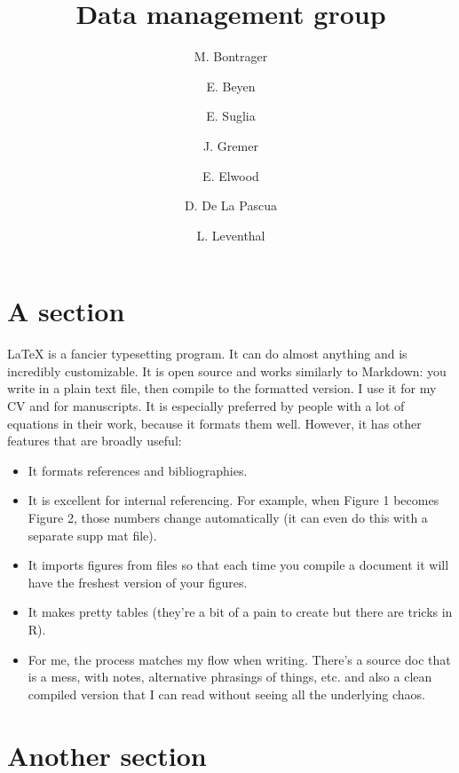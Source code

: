 \documentclass[11pt]{article}
\begin{document}
\title{Data management group}
\author[1]{M. Bontrager}
\author[1]{E. Beyen}
\author[2]{E. Suglia}
\author[3]{J. Gremer} 
\author[3]{E. Elwood}
\author[2]{D. De La Pascua}
\author[4]{L. Leventhal}



\maketitle
\tableofcontents

\section{A section}
\label{why_latex}

LaTeX is a fancier typesetting program. It can do almost anything and is incredibly customizable.  It is open source and works similarly to Markdown: you write in a plain text file, then compile to the formatted version. I use it for my CV and for manuscripts. 
It is especially preferred by people with a lot of equations in their work, because it formats them well. However, it has other features that are broadly useful: 

\begin{itemize}
\item{It formats references and bibliographies.}
\item{It is excellent for internal referencing. For example, when Figure 1 becomes Figure 2, those numbers change automatically (it can even do this with a separate supp mat file).}
\item{It imports figures from files so that each time you compile a document it will have the freshest version of your figures.}
\item{It makes pretty tables (they’re a bit of a pain to create but there are tricks in R).}
\item{For me, the process matches my flow when writing. There’s a source doc that is a mess, with notes, alternative phrasings of things, etc. and also a clean compiled version that I can read without seeing all the underlying chaos.}
\end{itemize}

\section{Another section}
\end{document}
